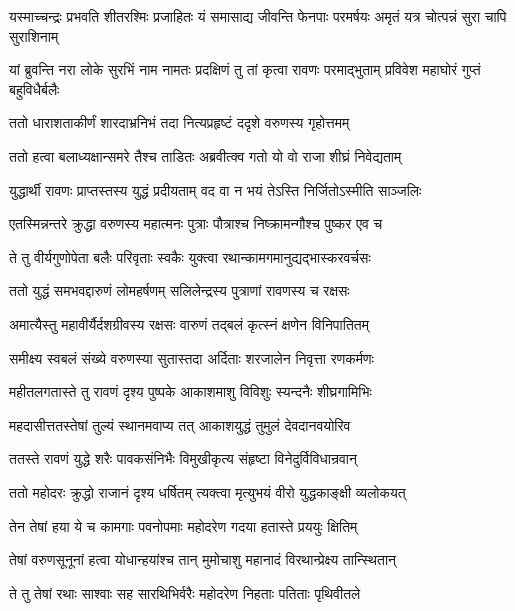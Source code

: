 \threelineshloka
{यस्माच्चन्द्रः प्रभवति शीतरश्मिः प्रजाहितः}
{यं समासाद्य जीवन्ति फेनपाः परमर्षयः}
{अमृतं यत्र चोत्पन्नं सुरा चापि सुराशिनाम्} %

\threelineshloka
{यां ब्रुवन्ति नरा लोके सुरभिं नाम नामतः}
{प्रदक्षिणं तु तां कृत्वा रावणः परमाद्भुताम्}
{प्रविवेश महाघोरं गुप्तं बहुविधैर्बलैः} %

\twolineshloka
{ततो धाराशताकीर्णं शारदाभ्रनिभं तदा}
{नित्यप्रहृष्टं ददृशे वरुणस्य गृहोत्तमम्} %

\twolineshloka
{ततो हत्वा बलाध्यक्षान्समरे तैश्च ताडितः}
{अब्रवीत्क्व गतो यो वो राजा शीघ्रं निवेद्यताम्} %

\twolineshloka
{युद्धार्थी रावणः प्राप्तस्तस्य युद्धं प्रदीयताम्}
{वद वा न भयं तेऽस्ति निर्जितोऽस्मीति साञ्जलिः} %

\twolineshloka
{एतस्मिन्नन्तरे क्रुद्धा वरुणस्य महात्मनः}
{पुत्राः पौत्राश्च निष्क्रामन्गौश्च पुष्कर एव च} %

\twolineshloka
{ते तु वीर्यगुणोपेता बलैः परिवृताः स्वकैः}
{युक्त्वा रथान्कामगमानुद्यद्भास्करवर्चसः} %

\twolineshloka
{ततो युद्धं समभवद्दारुणं लोमहर्षणम्}
{सलिलेन्द्रस्य पुत्राणां रावणस्य च रक्षसः} %

\twolineshloka
{अमात्यैस्तु महावीर्यैर्दशग्रीवस्य रक्षसः}
{वारुणं तद्बलं कृत्स्नं क्षणेन विनिपातितम्} %

\twolineshloka
{समीक्ष्य स्वबलं संख्ये वरुणस्या सुतास्तदा}
{अर्दिताः शरजालेन निवृत्ता रणकर्मणः} %

\twolineshloka
{महीतलगतास्ते तु रावणं दृश्य पुष्पके}
{आकाशमाशु विविशुः स्यन्दनैः शीघ्रगामिभिः} %

\twolineshloka
{महदासीत्ततस्तेषां तुल्यं स्थानमवाप्य तत्}
{आकाशयुद्धं तुमुलं देवदानवयोरिव} %

\twolineshloka
{ततस्ते रावणं युद्धे शरैः पावकसंनिभैः}
{विमुखीकृत्य संहृष्टा विनेदुर्विविधान्रवान्} %

\twolineshloka
{ततो महोदरः क्रुद्धो राजानं दृश्य धर्षितम्}
{त्यक्त्वा मृत्युभयं वीरो युद्धकाङ्क्षी व्यलोकयत्} %

\twolineshloka
{तेन तेषां हया ये च कामगाः पवनोपमाः}
{महोदरेण गदया हतास्ते प्रययुः क्षितिम्} %

\twolineshloka
{तेषां वरुणसूनूनां हत्वा योधान्हयांश्च तान्}
{मुमोचाशु महानादं विरथान्प्रेक्ष्य तान्स्थितान्} %

\twolineshloka
{ते तु तेषां रथाः साश्वाः सह सारथिभिर्वरैः}
{महोदरेण निहताः पतिताः पृथिवीतले} %

